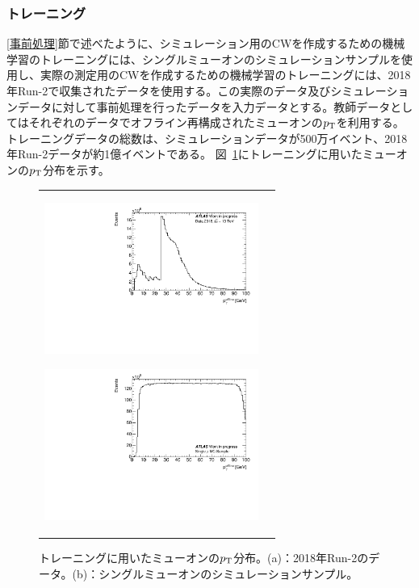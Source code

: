 \subsubsection{トレーニング}
\ref{事前処理}節で述べたように、シミュレーション用のCWを作成するための機械学習のトレーニングには、シングルミューオンのシミュレーションサンプルを使用し、実際の測定用のCWを作成するための機械学習のトレーニングには、2018年Run-2で収集されたデータを使用する。この実際のデータ及びシミュレーションデータに対して事前処理を行ったデータを入力データとする。教師データとしてはそれぞれのデータでオフライン再構成されたミューオンの$p_{\rm{T}}$を利用する。
トレーニングデータの総数は、シミュレーションデータが500万イベント、2018年Run-2データが約1億イベントである。
図~\ref{Inputdata}にトレーニングに用いたミューオンの$p_{\rm{T}}$分布を示す。
\begin{figure}
    \begin{tabular}{cc}
    \centering
    \begin{minipage}[b]{0.45\hsize}%
        \centering
        \hspace*{-1cm}
        \includegraphics[clip, width=7cm]{fig/4/Data_input_pt.pdf}
        \subcaption{}
        \label{Data_input}
    \end{minipage}%
    \begin{minipage}[b]{0.6\hsize}%
        \centering
        \hspace*{-1cm}
        \includegraphics[clip, width=7cm]{fig/4/MC_input_pt100.pdf}
        \subcaption{}
        \label{MC_input}
    \end{minipage}%
    \end{tabular}
    \caption{トレーニングに用いたミューオンの$p_{\rm{T}}$分布。(a)：2018年Run-2のデータ。(b)：シングルミューオンのシミュレーションサンプル。}
    \label{Inputdata}
\end{figure}

